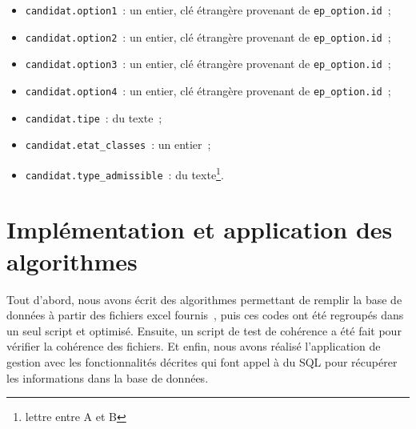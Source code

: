 \documentclass[12pt]{article}
\begin{document}
\begin{itemize}[label=\textbullet]
            \item \texttt{candidat.option1}~: un entier, clé étrangère provenant de \texttt{ep\_option.id}~;
            \item \texttt{candidat.option2}~: un entier, clé étrangère provenant de \texttt{ep\_option.id}~;
            \item \texttt{candidat.option3}~: un entier, clé étrangère provenant de \texttt{ep\_option.id}~;
            \item \texttt{candidat.option4}~: un entier, clé étrangère provenant de \texttt{ep\_option.id}~;
            \item \texttt{candidat.tipe}~: du texte~;
            \item \texttt{candidat.etat\_classes}~: un entier~;
            \item \texttt{candidat.type\_admissible}~: du texte\footnote{lettre entre A et B}.
        \end{itemize}

\newpage

\section{Implémentation et application des algorithmes}

Tout d'abord, nous avons écrit des algorithmes permettant de remplir la base de données à partir des fichiers excel fournis~\cite{excel}, puis ces codes ont été regroupés dans un seul script et optimisé. Ensuite, un script de test de cohérence a été fait pour vérifier la cohérence des fichiers. Et enfin, nous avons réalisé l'application de gestion avec les fonctionnalités décrites qui font appel à du SQL pour récupérer les informations dans la base de données.
\end{document}
